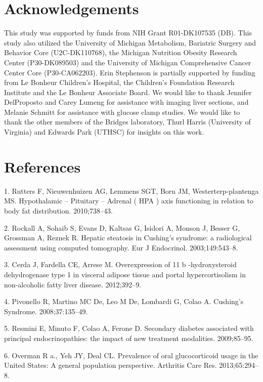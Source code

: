 \documentclass[11pt]{article} %
\begin{document}
\section*{Acknowledgements}\label{acknowledgements}

This study was supported by funds from NIH Grant R01-DK107535 (DB). This
study also utilized the University of Michigan Metabolism, Bariatric
Surgery and Behavior Core (U2C-DK110768), the Michigan Nutrition Obesity
Research Center (P30-DK089503) and the University of Michigan
Comprehensive Cancer Center Core (P30-CA062203). Erin Stephenson is
partially supported by funding from Le Bonheur Children's Hospital, the
Children's Foundation Research Institute and the Le Bonheur Associate
Board. We would like to thank Jennifer DelProposto and Carey Lumeng for
assistance with imaging liver sections, and Melanie Schmitt for
assistance with glucose clamp studies. We would like to thank the other
members of the Bridges laboratory, Thurl Harris (University of Virginia)
and Edwards Park (UTHSC) for insights on this work.

\section*{References}

1. Rutters F, Nieuwenhuizen AG, Lemmens SGT, Born JM,
Westerterp-plantenga MS. Hypothalamic -- Pituitary -- Adrenal ( HPA )
axis functioning in relation to body fat distribution. 2010;738--43.

2. Rockall A, Sohaib S, Evans D, Kaltsas G, Isidori A, Monson J, Besser
G, Grossman A, Reznek R. Hepatic steatosis in Cushing's syndrome: a
radiological assessment using computed tomography. Eur J Endocrinol.
2003;149:543--8.

3. Cerda J, Fardella CE, Arrese M. Overexpression of 11 b
-hydroxysteroid dehydrogenase type 1 in visceral adipose tissue and
portal hypercortisolism in non-alcoholic fatty liver disease.
2012;392--9.

4. Pivonello R, Martino MC De, Leo M De, Lombardi G, Colao A. Cushing's
Syndrome. 2008;37:135--49.

5. Resmini E, Minuto F, Colao A, Ferone D. Secondary diabetes
associated with principal endocrinopathies: the impact of new treatment
modalities. 2009;85--95.

6. Overman R a., Yeh JY, Deal CL. Prevalence of oral glucocorticoid
usage in the United States: A general population perspective. Arthritis
Care Res. 2013;65:294--8.
\end{document}
